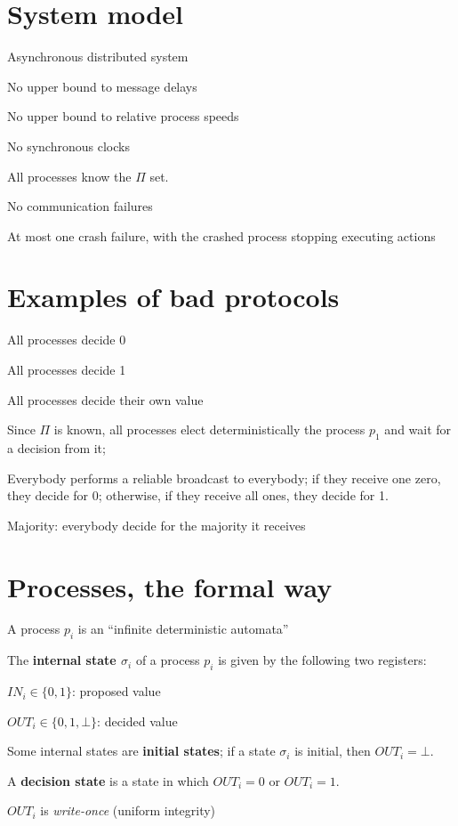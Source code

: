 \documentclass[12pt]{article}
\newcommand{\IN}{\mathit{IN}}
\newcommand{\OUT}{\mathit{OUT}}
\begin{document}
\section*{System model}

\BI
\item Asynchronous distributed system 
  \BI
  \item No upper bound to message delays
  \item No upper bound to relative process speeds
  \item No synchronous clocks
  \EI
\item All processes know the $\Pi$ set.
\item No communication failures
\item At most one crash failure, with the crashed process
  stopping executing actions
\EI

\section*{Examples of bad protocols}

\BI
\item All processes decide 0
\item All processes decide 1
\item All processes decide their own value
\item Since $\Pi$ is known, all processes elect deterministically
  the process $p_1$ and wait for a decision from it;
\item Everybody performs a reliable broadcast to everybody; if they receive one zero,
  they decide for 0; otherwise, if they receive all ones, they decide for 1.
\item Majority: everybody decide for the majority it receives
\EI

\section*{Processes, the formal way}

\BI
\item A process $p_i$ is an ``infinite deterministic automata''
\item The {\bf internal state $\sigma_i$} of a process $p_i$ is given by
  the following two registers: 
  \BI
  \item $\IN_i \in \{ 0, 1 \}$: proposed value
  \item $\OUT_i \in \{ 0, 1, \bot \}$: decided value
  \EI
\item Some internal states are {\bf initial states}; if a state $\sigma_i$
  is initial, then $\OUT_i = \bot$.
\item A {\bf decision state} is a state in which $\OUT_i = 0$ or $\OUT_i = 1$.
\item $OUT_i$ is {\em write-once} (uniform integrity)
\EI
\end{document}
